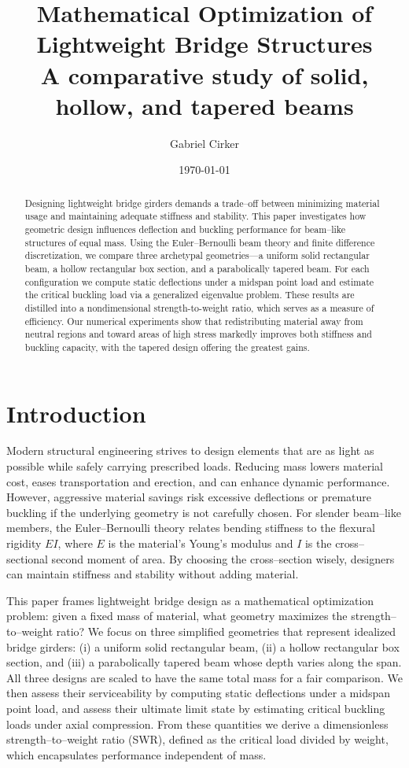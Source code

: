 \documentclass[11pt]{article}
\title{Mathematical Optimization of Lightweight Bridge Structures\\\small A comparative study of solid, hollow, and tapered beams}
\author{Gabriel Cirker}
\date{\today}
\begin{document}
\maketitle

\begin{abstract}
Designing lightweight bridge girders demands a trade--off between minimizing
material usage and maintaining adequate stiffness and stability. This paper
investigates how geometric design influences deflection and buckling
performance for beam--like structures of equal mass. Using the
Euler--Bernoulli beam theory and finite difference discretization, we compare
three archetypal geometries---a uniform solid rectangular beam, a hollow
rectangular box section, and a parabolically tapered beam.  For each
configuration we compute static deflections under a midspan point load and
estimate the critical buckling load via a generalized eigenvalue problem.
These results are distilled into a nondimensional strength-to-weight ratio,
which serves as a measure of efficiency.  Our numerical experiments show
that redistributing material away from neutral regions and toward areas of
high stress markedly improves both stiffness and buckling capacity, with the
tapered design offering the greatest gains.
\end{abstract}

\section{Introduction}

Modern structural engineering strives to design elements that are as light as
possible while safely carrying prescribed loads.  Reducing mass lowers
material cost, eases transportation and erection, and can enhance dynamic
performance.  However, aggressive material savings risk excessive
deflections or premature buckling if the underlying geometry is not
carefully chosen.  For slender beam--like members, the
Euler--Bernoulli theory relates bending stiffness to the flexural rigidity
$EI$, where $E$ is the material's Young's modulus and $I$ is the cross--
sectional second moment of area.  By choosing the cross--section wisely,
designers can maintain stiffness and stability without adding material.

This paper frames lightweight bridge design as a mathematical optimization
problem: given a fixed mass of material, what geometry maximizes the
strength--to--weight ratio?  We focus on three simplified geometries that
represent idealized bridge girders: (i) a uniform solid rectangular beam,
(ii) a hollow rectangular box section, and (iii) a parabolically tapered
beam whose depth varies along the span.  All three designs are scaled to
have the same total mass for a fair comparison.  We then assess their
serviceability by computing static deflections under a midspan point load,
and assess their ultimate limit state by estimating critical buckling loads
under axial compression.  From these quantities we derive a dimensionless
strength--to--weight ratio (SWR), defined as the critical load divided by
weight, which encapsulates performance independent of mass.
\end{document}
